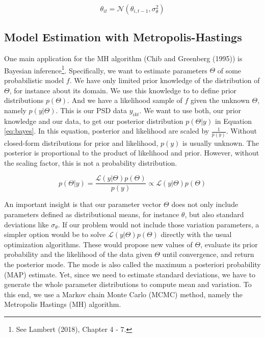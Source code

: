 \documentclass[12pt,english,a4paper,oneside]{article}
\theoremstyle{definition}
\theoremstyle{definition}
\theoremstyle{definition}
\theoremstyle{definition}
\theoremstyle{remark}
\begin{document}
\begin{equation}
\label{eq:dynamics}
\theta_{it} = \mathcal{N}(\theta_{i,t-1}, \sigma_{\theta}^2)
\end{equation}

\hypertarget{model-estimation-with-metropolis-hastings}{%
\subsection{Model Estimation with Metropolis-Hastings}\label{model-estimation-with-metropolis-hastings}}

One main application for the MH algorithm (Chib and Greenberg (1995)) is Bayesian inference\footnote{See Lambert (2018), Chapter 4 - 7.}. Specifically, we want to estimate parameters \(\Theta\) of some probabilistic model \(f\). We have only limited prior knowledge of the distribution of \(\Theta\), for instance about its domain. We use this knowledge to to define prior distributions \(p(\Theta)\). And we have a likelihood sample of \(f\) given the unknown \(\Theta\), namely \(p(y|\Theta)\). This is our PSD data \(y_{ikt}\). We want to use both, our prior knowledge and our data, to get our posterior distribution \(p(\Theta|y)\) in Equation \eqref{eq:bayes}. In this equation, posterior and likelihood are scaled by \(\frac{1}{p(y)}\). Without closed-form distributions for prior and likelihood, \(p(y)\) is usually unknown. The posterior is proportional to the product of likelihood and prior. However, without the scaling factor, this is not a probability distribution.

\begin{equation}
\label{eq:bayes}
p(\Theta|y) = \frac{\mathcal{L}(y|\Theta)p(\Theta)}{p(y)} \propto \mathcal{L}(y|\Theta)p(\Theta)
\end{equation}

\noindent
An important insight is that our parameter vector \(\Theta\) does not only include
parameters defined as distributional means, for instance \(\theta\), but also
standard deviations like \(\sigma_{\theta}\). If our problem would not include those
variation parameters, a simpler option would be to solve \(\mathcal{L}(y|\Theta)p(\Theta)\) directly with the usual optimization algorithms. These would
propose new values of \(\Theta\), evaluate its prior probability and the likelihood of
the data given \(\Theta\) until convergence, and return the posterior mode. The mode is also called the maximum a posteriori probability (MAP) estimate. Yet, since we need to estimate standard deviations,
we have to generate the whole parameter distributions to compute mean and variation. To this end, we use a Markov chain Monte Carlo (MCMC) method, namely the Metropolis Hastings (MH) algorithm.
\end{document}
